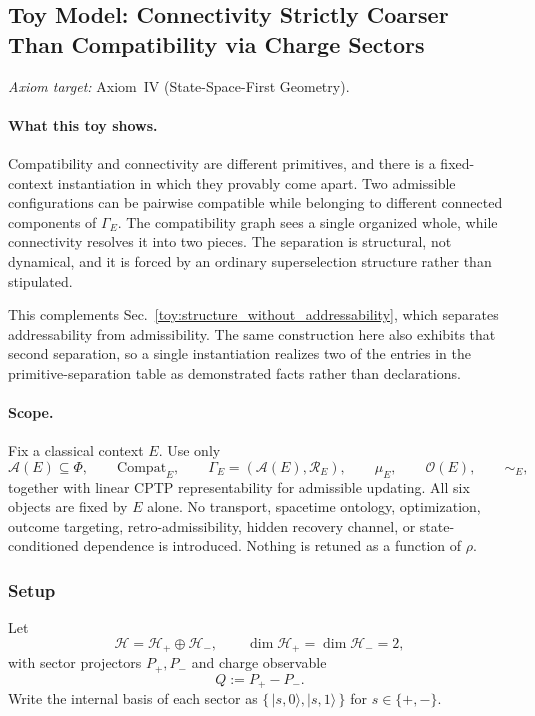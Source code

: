 \documentclass[aps,prx,onecolumn,11pt]{revtex4-2}
\theoremstyle{plain}
\theoremstyle{definition}
\theoremstyle{remark}
\begin{document}
\subsection{Toy Model: Connectivity Strictly Coarser Than Compatibility via Charge Sectors}
\label{toy:connectivity_strict_separation}

\noindent\emph{Axiom target:} Axiom~IV (State-Space-First Geometry).

\paragraph{What this toy shows.}

Compatibility and connectivity are different primitives, and there is a
fixed-context instantiation in which they provably come apart. Two
admissible configurations can be pairwise compatible while belonging to
different connected components of \(\Gamma_E\). The compatibility graph
sees a single organized whole, while connectivity resolves it into two
pieces. The separation is structural, not dynamical, and it is forced
by an ordinary superselection structure rather than stipulated.

This complements
Sec.~\ref{toy:structure_without_addressability}, which separates
addressability from admissibility. The same construction here also
exhibits that second separation, so a single instantiation realizes two
of the entries in the primitive-separation table as demonstrated facts
rather than declarations.

\paragraph{Scope.}

Fix a classical context \(E\). Use only
\[
\mathcal A(E)\subseteq\Phi,
\qquad
\mathrm{Compat}_E,
\qquad
\Gamma_E=(\mathcal A(E),\mathcal R_E),
\qquad
\mu_E,
\qquad
\mathcal O(E),
\qquad
\sim_E,
\]
together with linear CPTP representability for admissible updating. All
six objects are fixed by \(E\) alone. No transport, spacetime ontology,
optimization, outcome targeting, retro-admissibility, hidden recovery
channel, or state-conditioned dependence is introduced. Nothing is
retuned as a function of \(\rho\).

\subsubsection{Setup}
\label{toy:sector_setup}

Let
\[
\mathcal H=\mathcal H_+\oplus\mathcal H_-,
\qquad
\dim\mathcal H_+=\dim\mathcal H_-=2,
\]
with sector projectors \(P_+,P_-\) and charge observable
\[
Q:=P_+-P_-.
\]
Write the internal basis of each sector as
\(\{\,\lvert s,0\rangle,\lvert s,1\rangle\,\}\) for \(s\in\{+,-\}\).
\end{document}
